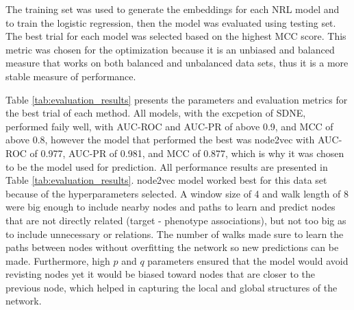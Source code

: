 The training set was used to generate the embeddings for each \ac{NRL} model and to train the logistic regression, then the model was evaluated using testing set. The best trial for each model was selected based on the highest \ac{MCC} score. This metric was chosen for the optimization because it is an unbiased and balanced measure that works on both balanced and unbalanced data sets, thus it is a more stable measure of performance.

Table \ref{tab:evaluation_results} presents the parameters and evaluation metrics for the best trial of each method. All models, with the excpetion of \ac{SDNE}, performed faily well, with AUC-ROC and AUC-PR of above 0.9, and MCC of above 0.8, however the model that performed the best was node2vec with AUC-ROC of 0.977, AUC-PR of 0.981, and \ac{MCC} of 0.877, which is why it was chosen to be the model used for prediction. All performance results are presented in Table \ref{tab:evaluation_results}. node2vec model worked best for this data set because of the hyperparameters selected. A window size of 4 and walk length of 8 were big enough to include nearby nodes and paths to learn and predict nodes that are not directly related (target - phenotype associations), but not too big as to include unnecessary or relations. The number of walks made sure to learn the paths between nodes without overfitting the network so new predictions can be made. Furthermore, high $p$ and $q$ parameters ensured that the model would avoid revisting nodes yet it would be biased toward nodes that are closer to the previous node, which helped in capturing the local and global structures of the network.

